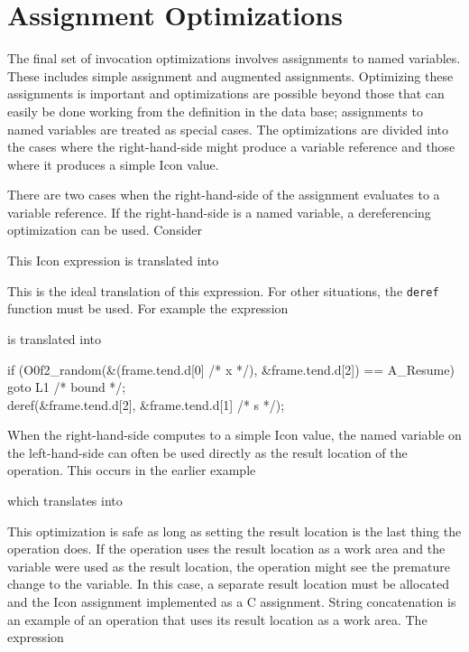 \section{Assignment Optimizations}

The final set of invocation optimizations involves assignments to
named variables. These includes simple assignment and augmented
assignments. Optimizing these assignments is important and
optimizations are possible beyond those that can easily be done
working from the definition in the data base; assignments to named
variables are treated as special cases. The optimizations are divided
into the cases where the right-hand-side might produce a variable
reference and those where it produces a simple Icon value.

There are two cases when the right-hand-side of the assignment
evaluates to a variable reference. If the right-hand-side is a named
variable, a dereferencing optimization can be used. Consider


\noindent This Icon expression is translated into 


\noindent
This is the ideal translation of this expression. For other
situations, the \texttt{deref} function must be used. For example the
expression


\noindent is translated into 

\goodbreak
\begin{iconcode}
\>if (O0f2\_random(\&(frame.tend.d[0] /* x */), \&frame.tend.d[2]) == A\_Resume)\\
\>\>goto L1 /* bound */;\\
\>deref(\&frame.tend.d[2], \&frame.tend.d[1] /* s */);\\
\end{iconcode}


When the right-hand-side computes to a simple Icon value, the named
variable on the left-hand-side can often be used directly as the
result location of the operation. This occurs in the earlier example


\noindent which translates into


This optimization is safe as long as setting the result location is
the last thing the operation does. If the operation uses the result
location as a work area and the variable were used as the result
location, the operation might see the premature change to the
variable. In this case, a separate result location must be allocated
and the Icon assignment implemented as a C assignment. String
concatenation is an example of an operation that uses its result
location as a work area. The expression

